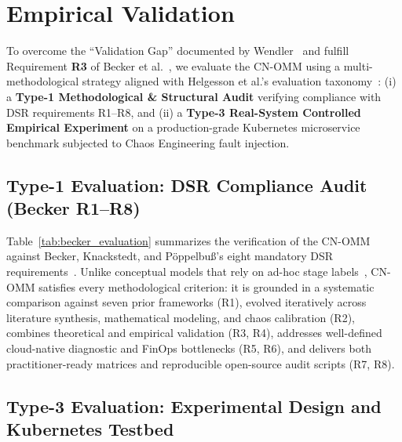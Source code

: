 \section{Empirical Validation}
\label{sec:empirical_validation}

To overcome the ``Validation Gap'' documented by Wendler~\cite{wendler_2012} and fulfill Requirement \textbf{R3} of Becker et al.~\cite{becker_2009}, we evaluate the CN-OMM using a multi-methodological strategy aligned with Helgesson et al.'s evaluation taxonomy~\cite{helgesson_2012}: (i) a \textbf{Type-1 Methodological \& Structural Audit} verifying compliance with DSR requirements R1--R8, and (ii) a \textbf{Type-3 Real-System Controlled Empirical Experiment} on a production-grade Kubernetes microservice benchmark subjected to Chaos Engineering fault injection.

\subsection{Type-1 Evaluation: DSR Compliance Audit (Becker R1--R8)}
\label{subsec:type1_evaluation}

Table~\ref{tab:becker_evaluation} summarizes the verification of the CN-OMM against Becker, Knackstedt, and P\"{o}ppelbu\ss's eight mandatory DSR requirements~\cite{becker_2009}. Unlike conceptual models that rely on ad-hoc stage labels~\cite{patel_2025, grafana_omm_2024}, CN-OMM satisfies every methodological criterion: it is grounded in a systematic comparison against seven prior frameworks (R1), evolved iteratively across literature synthesis, mathematical modeling, and chaos calibration (R2), combines theoretical and empirical validation (R3, R4), addresses well-defined cloud-native diagnostic and FinOps bottlenecks (R5, R6), and delivers both practitioner-ready matrices and reproducible open-source audit scripts (R7, R8).



\subsection{Type-3 Evaluation: Experimental Design and Kubernetes Testbed}
\label{subsec:type3_design}

